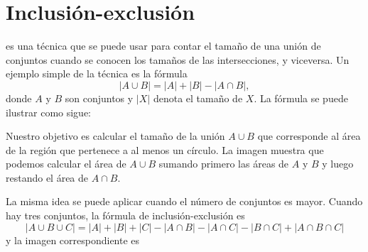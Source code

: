 \section{Inclusión-exclusión}


 es una técnica
que se puede usar para contar el tamaño
de una unión de conjuntos cuando se conocen los tamaños de
las intersecciones, y viceversa.
Un ejemplo simple de la técnica es la fórmula
\[ |A \cup B| = |A| + |B| - |A \cap B|,\]
donde $A$ y $B$ son conjuntos y $|X|$
denota el tamaño de $X$.
La fórmula se puede ilustrar como sigue:

\begin{center}
\end{center}

Nuestro objetivo es calcular
el tamaño de la unión $A \cup B$
que corresponde al área de la región
que pertenece a al menos un círculo.
La imagen muestra que podemos calcular
el área de $A \cup B$ sumando primero las
áreas de $A$ y $B$ y luego restando
el área de $A \cap B$.

La misma idea se puede aplicar cuando el número
de conjuntos es mayor.
Cuando hay tres conjuntos, la fórmula de inclusión-exclusión es
\[ |A \cup B \cup C| = |A| + |B| + |C| - |A \cap B|  - |A \cap C|  - |B \cap C| + |A \cap B \cap C| \]
y la imagen correspondiente es

\begin{center}
\end{center}

